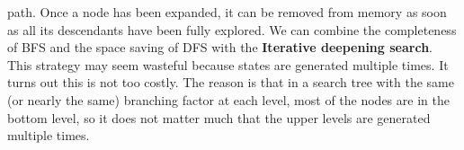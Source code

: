 path. Once a node has been expanded, it can be removed from memory as soon as all its descendants have been fully explored.\newline\newline
We can combine the completeness of BFS and the space saving of DFS with the \textbf{Iterative deepening search}. This strategy may seem wasteful because states are generated multiple times. It turns out this is not too costly. The reason is that in a search tree with the same (or nearly the same) branching factor at each level, most of the nodes are in the bottom level, so it does not matter much that the upper levels are generated multiple times.\newline\newline


